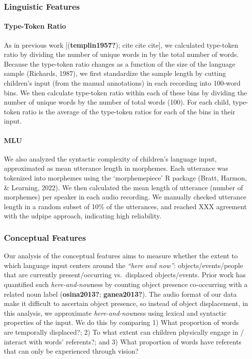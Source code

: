 \documentclass[
  man,floatsintext]{apa6}
\let\oldparagraph\paragraph
\renewcommand{\paragraph}[1]{\oldparagraph{#1}\mbox{}}
\begin{document}
\hypertarget{linguistic-features}{%
\subsubsection{Linguistic Features}\label{linguistic-features}}

\hypertarget{type-token-ratio}{%
\paragraph{Type-Token Ratio}\label{type-token-ratio}}

As in previous work {[}(\textbf{templin1957?}); cite cite cite{]}, we calculated type-token ratio by dividing the number of unique words in by the total number of words. Because the type-token ratio changes as a function of the size of the language sample (Richards, 1987), we first standardize the sample length by cutting children's input (from the manual annotations) in each recording into 100-word bins. We then calculate type-token ratio within each of these bins by dividing the number of unique words by the number of total words (100). For each child, type-token ratio is the average of the type-token ratios for each of the bins in their input.

\hypertarget{mlu}{%
\paragraph{MLU}\label{mlu}}

We also analyzed the syntactic complexity of children's language input, approximated as mean utterance length in morphemes. Each utterance was tokenized into morphemes using the `morphemepiece' R package (Bratt, Harmon, \& Learning, 2022). We then calculated the mean length of utterance (number of morphemes) per speaker in each audio recording. We manually checked utterance length in a random subset of 10\% of the utterances, and reached XXX agreement with the udpipe approach, indicating high reliability.

\hypertarget{conceptual-features}{%
\subsubsection{Conceptual Features}\label{conceptual-features}}

Our analysis of the conceptual features aims to measure whether the extent to which language input centers around the \emph{``here and now''}: objects/events/people that are currently present/occurring vs.~displaced objects/events. Prior work has quantified such \emph{here-and-now}ness by counting object presence co-occurring with a related noun label (\textbf{osina2013?}; \textbf{ganea2013?}). The audio format of our data make it difficult to ascertain object presence, so instead of object displacement, in this analysis, we approximate \emph{here-and-now}ness using lexical and syntactic properties of the input. We do this by comparing 1) What proportion of words are temporally displaced?; 2) To what extent can children physically engage in / interact with words' referents?; and 3) What proportion of words have referents that can only be experienced through vision?
\end{document}
